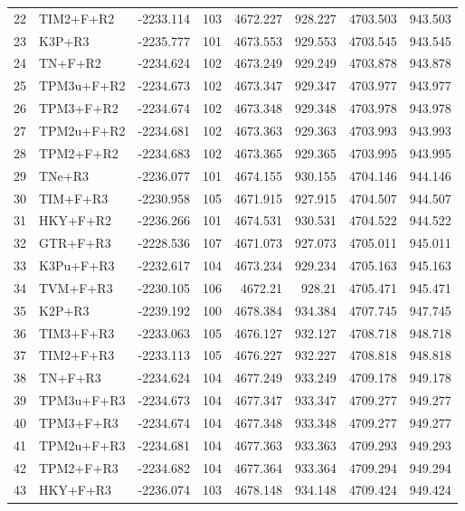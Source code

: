\documentclass[12pt]{article}
\begin{document}
\begin{longtable}{clrrrrrr}
	22 & TIM2+F+R2 & -2233.114 & 103 & 4672.227 & 928.227 & 4703.503 & 943.503 \\ 
	23 & K3P+R3 & -2235.777 & 101 & 4673.553 & 929.553 & 4703.545 & 943.545 \\ 
	24 & TN+F+R2 & -2234.624 & 102 & 4673.249 & 929.249 & 4703.878 & 943.878 \\ 
	25 & TPM3u+F+R2 & -2234.673 & 102 & 4673.347 & 929.347 & 4703.977 & 943.977 \\ 
	26 & TPM3+F+R2 & -2234.674 & 102 & 4673.348 & 929.348 & 4703.978 & 943.978 \\ 
	27 & TPM2u+F+R2 & -2234.681 & 102 & 4673.363 & 929.363 & 4703.993 & 943.993 \\ 
	28 & TPM2+F+R2 & -2234.683 & 102 & 4673.365 & 929.365 & 4703.995 & 943.995 \\ 
	29 & TNe+R3 & -2236.077 & 101 & 4674.155 & 930.155 & 4704.146 & 944.146 \\ 
	30 & TIM+F+R3 & -2230.958 & 105 & 4671.915 & 927.915 & 4704.507 & 944.507 \\ 
	31 & HKY+F+R2 & -2236.266 & 101 & 4674.531 & 930.531 & 4704.522 & 944.522 \\ 
	32 & GTR+F+R3 & -2228.536 & 107 & 4671.073 & 927.073 & 4705.011 & 945.011 \\ 
	33 & K3Pu+F+R3 & -2232.617 & 104 & 4673.234 & 929.234 & 4705.163 & 945.163 \\ 
	34 & TVM+F+R3 & -2230.105 & 106 & 4672.21 & 928.21 & 4705.471 & 945.471 \\ 
	35 & K2P+R3 & -2239.192 & 100 & 4678.384 & 934.384 & 4707.745 & 947.745 \\ 
	36 & TIM3+F+R3 & -2233.063 & 105 & 4676.127 & 932.127 & 4708.718 & 948.718 \\ 
	37 & TIM2+F+R3 & -2233.113 & 105 & 4676.227 & 932.227 & 4708.818 & 948.818 \\ 
	38 & TN+F+R3 & -2234.624 & 104 & 4677.249 & 933.249 & 4709.178 & 949.178 \\ 
	39 & TPM3u+F+R3 & -2234.673 & 104 & 4677.347 & 933.347 & 4709.277 & 949.277 \\ 
	40 & TPM3+F+R3 & -2234.674 & 104 & 4677.348 & 933.348 & 4709.277 & 949.277 \\ 
	41 & TPM2u+F+R3 & -2234.681 & 104 & 4677.363 & 933.363 & 4709.293 & 949.293 \\ 
	42 & TPM2+F+R3 & -2234.682 & 104 & 4677.364 & 933.364 & 4709.294 & 949.294 \\ 
	43 & HKY+F+R3 & -2236.074 & 103 & 4678.148 & 934.148 & 4709.424 & 949.424 \\ 

\end{longtable}
\end{document}
